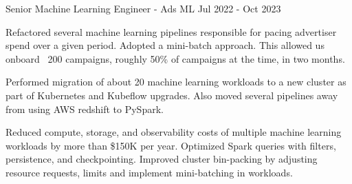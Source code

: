 \begin{cventries}
\cventrywide
  {Senior Machine Learning Engineer - Ads ML} %
  {}
  {}
  {Jul 2022 - Oct 2023} %
  {
    \begin{cvitems} %
      \item {Refactored several machine learning pipelines responsible for pacing advertiser spend over a given period. Adopted a mini-batch approach. This allowed us onboard ~200 campaigns, roughly 50\% of campaigns at the time, in two months. }
      \item {Performed migration of about 20 machine learning workloads to a new cluster as part of Kubernetes and Kubeflow upgrades. Also moved several pipelines away from using AWS redshift to PySpark. }
      \item {Reduced compute, storage, and observability costs of multiple machine learning workloads by more than \$150K per year. Optimized Spark queries with filters, persistence, and checkpointing. Improved cluster bin-packing by adjusting resource requests, limits and implement mini-batching in workloads. }
    \end{cvitems}
  }


\end{cventries}
